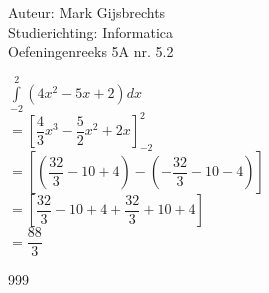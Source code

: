 \documentclass[a4paper]{article}
\newcommand{\dint}{\displaystyle\int}
\begin{document}
\noindent \large Auteur: Mark Gijsbrechts \\
\noindent \large Studierichting: Informatica\\
\noindent \large Oefeningenreeks 5A nr. 5.2\\

\medskip

\normalsize





$ \dint\limits_{-2}^{2} \left( 4x^2 - 5x +2 \right) dx  $ \\

$= \left[ \dfrac{4}{3}x^3 - \dfrac{5}{2}x^2 + 2x \right]_{-2}^{2}  $ \\

$= \left[ \left( \dfrac{32}{3} - 10 + 4 \right) - \left( -\dfrac{32}{3} - 10 - 4 \right) \right]  $ \\

$= \left[ \dfrac{32}{3} - 10 + 4 + \dfrac{32}{3} + 10 + 4 \right]  $ \\

$= \dfrac{88}{3}  $ \\




\begin{thebibliography}{999}
\end{thebibliography}
\end{document}

